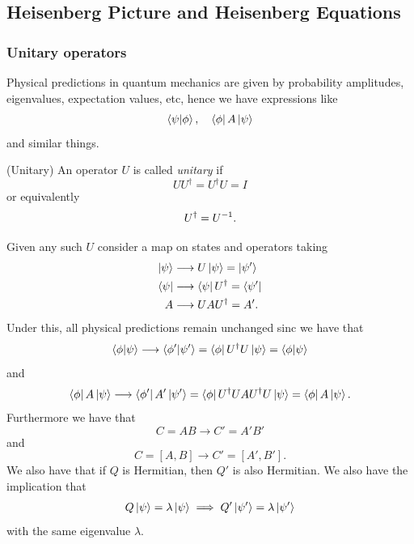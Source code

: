 \documentclass{article}
\begin{document}
\subsection{Heisenberg Picture and Heisenberg Equations}
\subsubsection{Unitary operators}
Physical predictions in quantum mechanics are given by probability amplitudes, eigenvalues, expectation values, etc, hence we have expressions like
\[
	\bra{\psi}\ket{\phi},\quad \bra{\phi}A\ket{\psi}
\]
and similar things. 
\begin{definition}
	(Unitary) An operator $ U $ is called \textit{unitary} if
	\[
	  UU^\dagger = U^\dagger U = I
	\]
	or equivalently
	\[
		U^\dagger = {U}^{-1}.
	\]
\end{definition}
Given any such $ U $ consider a map on states and operators taking
\begin{align*}
	\ket \psi &\longrightarrow U\ket \psi = \ket{\psi'} \\
	\bra \psi &\longrightarrow \bra \psi U^\dagger = \bra{\psi'} \\
	A&\longrightarrow  UAU^\dagger = A'.
\end{align*}
Under this, all physical predictions remain unchanged sinc we have that
\[
	\bra{\phi}\ket{\psi} \longrightarrow \bra{\phi'}\ket{\psi'} = \bra{\phi} U^\dagger U\ket{\psi} = \bra{\phi}\ket{\psi}
\]
and
\[
	\bra{\phi}A\ket{\psi} \longrightarrow \bra{\phi'}A'\ket{\psi'} = \bra{\phi}U^\dagger UAU^\dagger U \ket{\psi} = \bra{\phi}A\ket{\psi}.
\]
Furthermore we have that
\[
  C = AB\longrightarrow C'=A'B'
\]
and
\[
	C =[A,B] \longrightarrow C'=[A',B'].
\]
We also have that if $ Q $ is Hermitian, then $ Q' $ is also Hermitian. We also have the implication that 
\begin{align*}
	Q\ket{\psi} = \lambda \ket{\psi} \implies Q'\ket{\psi'} = \lambda \ket{\psi'}
\end{align*}
with the same eigenvalue $ \lambda $.
\end{document}
